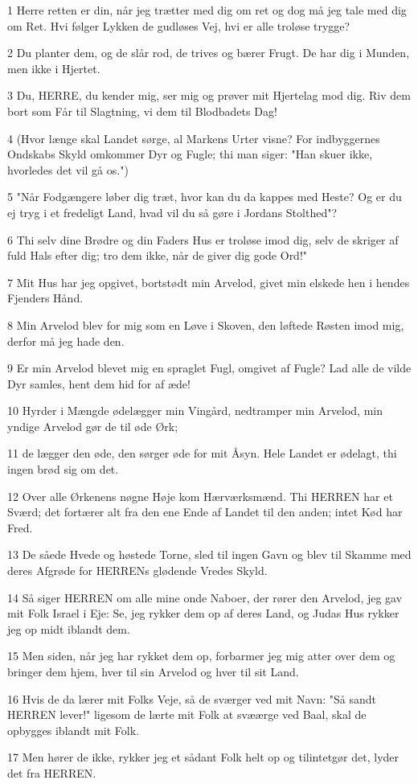 \par 1 Herre retten er din, når jeg trætter med dig om ret og dog må jeg tale med dig om Ret. Hvi følger Lykken de gudløses Vej, hvi er alle troløse trygge?
\par 2 Du planter dem, og de slår rod, de trives og bærer Frugt. De har dig i Munden, men ikke i Hjertet.
\par 3 Du, HERRE, du kender mig, ser mig og prøver mit Hjertelag mod dig. Riv dem bort som Får til Slagtning, vi dem til Blodbadets Dag!
\par 4 (Hvor længe skal Landet sørge, al Markens Urter visne? For indbyggernes Ondskabs Skyld omkommer Dyr og Fugle; thi man siger: "Han skuer ikke, hvorledes det vil gå os.")
\par 5 "Når Fodgængere løber dig træt, hvor kan du da kappes med Heste? Og er du ej tryg i et fredeligt Land, hvad vil du så gøre i Jordans Stolthed"?
\par 6 Thi selv dine Brødre og din Faders Hus er troløse imod dig, selv de skriger af fuld Hals efter dig; tro dem ikke, når de giver dig gode Ord!"
\par 7 Mit Hus har jeg opgivet, bortstødt min Arvelod, givet min elskede hen i hendes Fjenders Hånd.
\par 8 Min Arvelod blev for mig som en Løve i Skoven, den løftede Røsten imod mig, derfor må jeg hade den.
\par 9 Er min Arvelod blevet mig en spraglet Fugl, omgivet af Fugle? Lad alle de vilde Dyr samles, hent dem hid for af æde!
\par 10 Hyrder i Mængde ødelægger min Vingård, nedtramper min Arvelod, min yndige Arvelod gør de til øde Ørk;
\par 11 de lægger den øde, den sørger øde for mit Åsyn. Hele Landet er ødelagt, thi ingen brød sig om det.
\par 12 Over alle Ørkenens nøgne Høje kom Hærværksmænd. Thi HERREN har et Sværd; det fortærer alt fra den ene Ende af Landet til den anden; intet Kød har Fred.
\par 13 De såede Hvede og høstede Torne, sled til ingen Gavn og blev til Skamme med deres Afgrøde for HERRENs glødende Vredes Skyld.
\par 14 Så siger HERREN om alle mine onde Naboer, der rører den Arvelod, jeg gav mit Folk Israel i Eje: Se, jeg rykker dem op af deres Land, og Judas Hus rykker jeg op midt iblandt dem.
\par 15 Men siden, når jeg har rykket dem op, forbarmer jeg mig atter over dem og bringer dem hjem, hver til sin Arvelod og hver til sit Land.
\par 16 Hvis de da lærer mit Folks Veje, så de sværger ved mit Navn: "Så sandt HERREN lever!" ligesom de lærte mit Folk at svæærge ved Baal, skal de opbygges iblandt mit Folk.
\par 17 Men hører de ikke, rykker jeg et sådant Folk helt op og tilintetgør det, lyder det fra HERREN.

